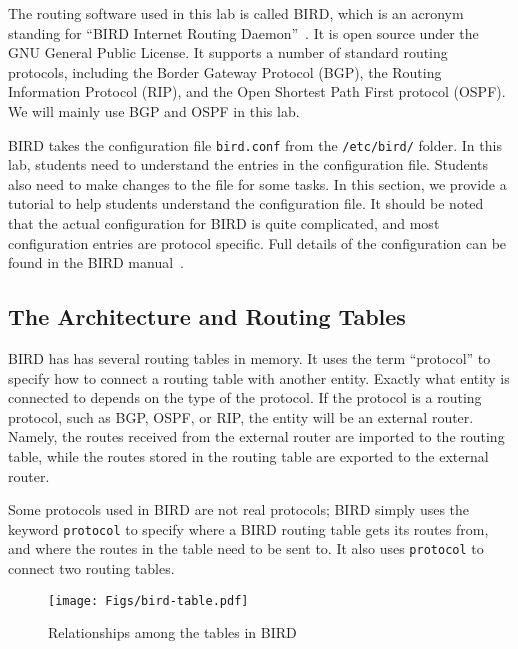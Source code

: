 The routing software used in this lab is called BIRD, which is 
an acronym standing for ``BIRD Internet Routing Daemon''~\cite{bird}.
It is open source under the GNU General Public License. It 
supports a number of standard routing protocols, including 
the Border Gateway Protocol (BGP),
the Routing Information Protocol (RIP),
and the Open Shortest Path First protocol (OSPF). We will
mainly use BGP and OSPF in this lab. 


BIRD takes the configuration
file \texttt{bird.conf} from the \texttt{/etc/bird/} folder.
In this lab, students need to understand the entries in the 
configuration file. Students also need to make changes
to the file for some tasks. In this section, we provide 
a tutorial to help students understand the 
configuration file. It should be noted that the actual configuration
for BIRD is quite complicated, and most configuration entries 
are protocol specific. Full details of the configuration 
can be found in the BIRD manual~\cite{birdmanual}.


\subsection{The Architecture and Routing Tables} 

BIRD has has several routing tables in memory. It uses
the term ``protocol'' to specify how 
to connect a routing table with another entity. Exactly
what entity is connected to depends on the type of the protocol.
If the protocol is a routing protocol, 
such as BGP, OSPF, or RIP, the entity will be an external router.
Namely, the routes received from the external router
are imported to the routing table, while 
the routes stored in the routing table are exported 
to the external router.

Some protocols used in BIRD are not real protocols; 
BIRD simply uses the keyword \texttt{protocol} to specify where
a BIRD routing table gets its routes from, and where the routes
in the table need to be sent to. It also uses \texttt{protocol} 
to connect two routing tables. 

\begin{figure}[htb]
  \begin{center}
    \texttt{[image: Figs/bird-table.pdf]}
  \end{center}
  \caption{Relationships among the tables in BIRD}
  \label{bgp:fig:bird-table}
\end{figure}
 
